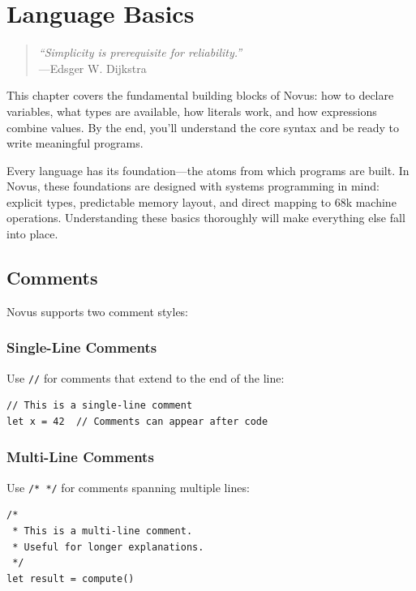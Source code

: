 \chapter{Language Basics}
\label{ch:basics}

\begin{quote}
\textit{``Simplicity is prerequisite for reliability.''}\\
---Edsger W. Dijkstra
\end{quote}

\vspace{1em}

This chapter covers the fundamental building blocks of Novus: how to declare variables, what types are available, how literals work, and how expressions combine values. By the end, you'll understand the core syntax and be ready to write meaningful programs.

Every language has its foundation---the atoms from which programs are built. In Novus, these foundations are designed with systems programming in mind: explicit types, predictable memory layout, and direct mapping to 68k machine operations. Understanding these basics thoroughly will make everything else fall into place.

\section{Comments}

Novus supports two comment styles:

\subsection{Single-Line Comments}

Use \texttt{//} for comments that extend to the end of the line:

\begin{lstlisting}
// This is a single-line comment
let x = 42  // Comments can appear after code
\end{lstlisting}

\subsection{Multi-Line Comments}

Use \texttt{/* */} for comments spanning multiple lines:

\begin{lstlisting}
/*
 * This is a multi-line comment.
 * Useful for longer explanations.
 */
let result = compute()
\end{lstlisting}


